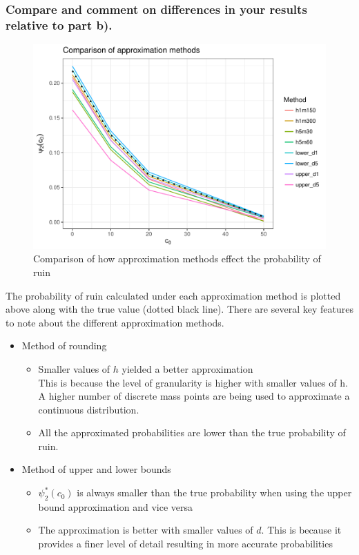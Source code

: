 \documentclass[titlepage]{article}
\begin{document}
	\subsubsection{Compare and comment on differences in your results relative to part b).}
	\begin{figure}[H]
		\centering
		\includegraphics[scale = 1.1]{Approximations.PDF}
		\caption{Comparison of how approximation methods effect the probability of ruin} \label{fig:T2: Approximation comparison}
	\end{figure} 
	The probability of ruin calculated under each approximation method is plotted above along with the true value (dotted black line). There are several key features to note about the different approximation methods.
	\begin{itemize}
		\item Method of rounding
		\begin{itemize}
			\item Smaller values of $h$ yielded a better approximation\\
			This is because the level of granularity is higher with smaller values of h. A higher number of discrete mass points are being used to approximate a continuous distribution.
			\item All the approximated probabilities are lower than the true probability of ruin.
		\end{itemize}
		
		\item Method of upper and lower bounds
		\begin{itemize}
			\item $\psi_2^*(c_0)$ is always smaller than the true probability when using the upper bound approximation and vice versa
			\item The approximation is better with smaller values of $d$. This is because it provides a finer level of detail resulting in more accurate probabilities
		\end{itemize}
	\end{itemize}
	
\end{document}
